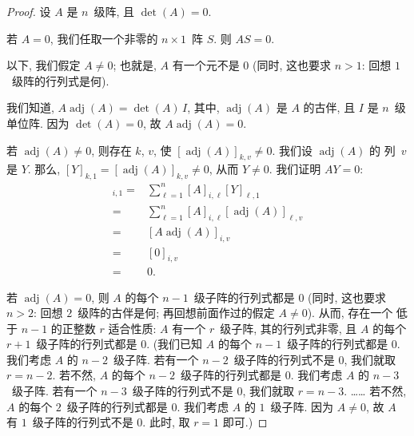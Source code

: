 \documentclass[../libro.tex]{subfiles}
\begin{document}
\begin{proof}
    设 \(A\) 是 \(n\)~级阵,
    且 \(\det {(A)} = 0\).

    若 \(A = 0\),
    我们任取一个非零的 \(n \times 1\)~阵 \(S\).
    则 \(AS = 0\).

    以下, 我们假定 \(A \neq 0\);
    也就是, \(A\) 有一个元不是 \(0\)
    (同时, 这也要求 \(n > 1\):
    回想 \(1\)~级阵的行列式是何).

    我们知道,
    \(A \operatorname{adj} {(A)} = \det {(A)}\, I\),
    其中, \(\operatorname{adj} {(A)}\)
    是 \(A\) 的古伴,
    且 \(I\) 是 \(n\)~级单位阵.
    因为 \(\det {(A)} = 0\),
    故 \(A \operatorname{adj} {(A)} = 0\).

    若 \(\operatorname{adj} {(A)} \neq 0\),
    则存在 \(k\), \(v\), 使
    \([\operatorname{adj} {(A)}]_{k,v} \neq 0\).
    我们设 \(\operatorname{adj} {(A)}\) 的%
    列~\(v\) 是 \(Y\).
    那么, \([Y]_{k,1}
    = [\operatorname{adj} {(A)}]_{k,v} \neq 0\),
    从而 \(Y \neq 0\).
    我们证明 \(AY = 0\):
    \begin{align*}
        [AY]_{i,1}
        = {} &
        \sum_{\ell = 1}^{n}
        {[A]_{i,\ell} [Y]_{\ell,1}}
        \\
        = {} &
        \sum_{\ell = 1}^{n}
        {[A]_{i,\ell} [\operatorname{adj} {(A)}]_{\ell,v}}
        \\
        = {} &
        [A \operatorname{adj} {(A)}]_{i,v}
        \\
        = {} &
        [0]_{i,v}
        \\
        = {} &
        0.
    \end{align*}

    若 \(\operatorname{adj} {(A)} = 0\),
    则 \(A\) 的每个 \(n-1\)~级子阵的行列式都是 \(0\)
    (同时, 这也要求 \(n > 2\): %
    回想 \(2\)~级阵的古伴是何;
    再回想前面作过的假定 \(A \neq 0\)). %
    从而, 存在一个%
    低于 \(n-1\) 的正整数 \(r\)
    适合性质:
    \(A\) 有一个 \(r\)~级子阵, 其的行列式非零,
    且 \(A\) 的每个 \(r+1\)~级子阵的行列式都是 \(0\).
    (我们已知 \(A\) 的每个 \(n-1\)~级子阵的行列式都是 \(0\). %
    我们考虑 \(A\) 的 \(n-2\)~级子阵.
    若有一个 \(n-2\)~级子阵的行列式不是 \(0\),
    我们就取 \(r = n-2\).
    若不然, \(A\) 的每个 \(n-2\)~级子阵的行列式都是 \(0\).
    我们考虑 \(A\) 的 \(n-3\)~级子阵.
    若有一个 \(n-3\)~级子阵的行列式不是 \(0\),
    我们就取 \(r = n-3\).
    ……
    若不然, \(A\) 的每个 \(2\)~级子阵的行列式都是 \(0\).
    我们考虑 \(A\) 的 \(1\)~级子阵.
    因为 \(A \neq 0\),
    故 \(A\) 有 \(1\)~级子阵的行列式不是 \(0\).
    此时, 取 \(r = 1\) 即可.) %


\end{proof}
\end{document}
